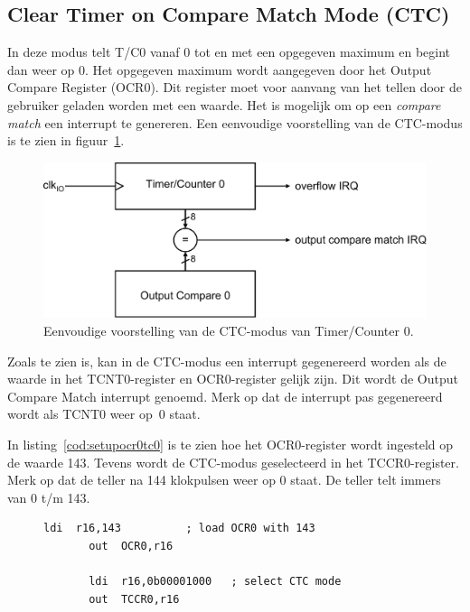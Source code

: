 \subsection{Clear Timer on Compare Match Mode (CTC)}
\label{sec:tc0ctcmode}
In deze modus telt T/C0 vanaf 0 tot en met een opgegeven maximum en begint
dan weer op 0. Het opgegeven maximum wordt aangegeven door het Output Compare
Register (OCR0). Dit register moet voor aanvang van het tellen door de
gebruiker geladen worden met een waarde. Het is mogelijk om op een
\textsl{compare match} een interrupt te genereren. Een eenvoudige
voorstelling van de CTC-modus is te zien in figuur~\ref{fig:timsimplectctc0}.

\begin{figure}[!ht]
\centering
\includegraphics[scale=\figscale]{images/timsimplectctc0}
\caption{Eenvoudige voorstelling van de CTC-modus van Timer/Counter 0.}
\label{fig:timsimplectctc0}
\end{figure}

Zoals te zien is, kan in de CTC-modus een interrupt gegenereerd worden als
de waarde in het TCNT0-register en OCR0-register gelijk zijn. Dit wordt
de Output Compare Match interrupt genoemd. Merk op dat de interrupt pas
gegenereerd wordt als TCNT0 weer op~0 staat.

In listing~\ref{cod:setupocr0tc0} is te zien hoe het OCR0-register wordt
ingesteld op de waarde 143. Tevens wordt de CTC-modus geselecteerd in het
TCCR0-register. Merk op dat de teller na 144 klokpulsen weer op 0 staat.
De teller telt immers van 0 t/m 143.

\begin{figure}[!ht]
\begin{lstlisting}[language=AVRassembler,caption=Instellen van het OCR0-register van T/C0,label=cod:setupocr0tc0]
       ldi  r16,143          ; load OCR0 with 143
       out  OCR0,r16
       
       ldi  r16,0b00001000   ; select CTC mode 
       out  TCCR0,r16
\end{lstlisting}
\end{figure}


